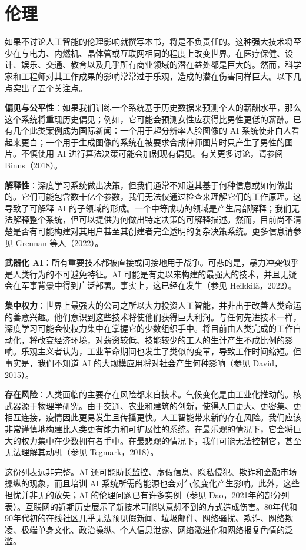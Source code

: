 \section{伦理}
如果不讨论人工智能的伦理影响就撰写本书，将是不负责任的。这种强大技术将至少在与电力、内燃机、晶体管或互联网相同的程度上改变世界。在医疗保健、设计、娱乐、交通、教育以及几乎所有商业领域的潜在益处都是巨大的。然而，科学家和工程师对其工作成果的影响常常过于乐观，造成的潜在伤害同样巨大。以下几点突出了五个关注点。

\textbf{偏见与公平性}：如果我们训练一个系统基于历史数据来预测个人的薪酬水平，那么这个系统将重现历史偏见；例如，它可能会预测女性应获得比男性更低的薪酬。已有几个此类案例成为国际新闻：一个用于超分辨率人脸图像的 AI 系统使非白人看起来更白；一个用于生成图像的系统在被要求合成律师图片时只产生了男性的图片。不慎使用 AI 进行算法决策可能会加剧现有偏见。有关更多讨论，请参阅 Binns（2018）。


\textbf{解释性}：深度学习系统做出决策，但我们通常不知道其基于何种信息或如何做出的。它们可能包含数十亿个参数，我们无法仅通过检查来理解它们的工作原理。这导致了可解释 AI 的子领域的形成。一个中等成功的领域是产生局部解释；我们无法解释整个系统，但可以提供为何做出特定决策的可解释描述。然而，目前尚不清楚是否有可能构建对其用户甚至其创建者完全透明的复杂决策系统。更多信息请参见 Grennan 等人（2022）。


\textbf{武器化 AI}：所有重要技术都被直接或间接地用于战争。可悲的是，暴力冲突似乎是人类行为的不可避免特征。AI 可能是有史以来构建的最强大的技术，并且无疑会在军事背景中得到广泛部署。事实上，这已经在发生（参见 Heikkilä，2022）。


\textbf{集中权力}：世界上最强大的公司之所以大力投资人工智能，并非出于改善人类命运的善意兴趣。他们意识到这些技术将使他们获得巨大利润。与任何先进技术一样，深度学习可能会使权力集中在掌握它的少数组织手中。将目前由人类完成的工作自动化，将改变经济环境，对薪资较低、技能较少的工人的生计产生不成比例的影响。乐观主义者认为，工业革命期间也发生了类似的变革，导致工作时间缩短。但事实是，我们不知道 AI 的大规模应用将对社会产生何种影响（参见 David，2015）。


\textbf{存在风险}：人类面临的主要存在风险都来自技术。气候变化是由工业化推动的。核武器源于物理学研究。由于交通、农业和建筑的创新，使得人口更大、更密集、更相互连接，疫情因此更易发生且传播更快。人工智能带来新的存在风险。我们应该非常谨慎地构建比人类更有能力和可扩展性的系统。在最乐观的情况下，它会将巨大的权力集中在少数拥有者手中。在最悲观的情况下，我们可能无法控制它，甚至无法理解其动机（参见 Tegmark，2018）。

这份列表远非完整。AI 还可能助长监控、虚假信息、隐私侵犯、欺诈和金融市场操纵的现象，而且培训 AI 系统所需的能源也会对气候变化产生影响。此外，这些担忧并非无的放矢；AI 的伦理问题已有许多实例（参见 Dao，2021年的部分列表）。互联网的近期历史展示了新技术可能以意想不到的方式造成伤害。80年代和90年代初的在线社区几乎无法预见假新闻、垃圾邮件、网络骚扰、欺诈、网络欺凌、极端单身文化、政治操纵、个人信息泄露、网络激进化和网络报复色情的泛滥。

